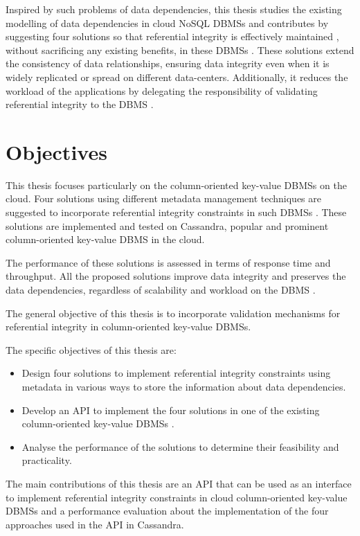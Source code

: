 Inspired by such problems of data dependencies,  this thesis studies the existing
modelling of data dependencies in cloud \ac{NoSQL}  \acp{DBMS}  and contributes by
suggesting four solutions so that referential integrity is effectively
maintained , without sacrificing any existing benefits,  in these \acp{DBMS} . 
These solutions extend the consistency of data relationships,   ensuring  data
integrity even when it is widely replicated or spread on different data-centers. 
Additionally,  it reduces the workload of the applications by delegating the
responsibility of validating referential integrity to the \ac{DBMS} . 



\section{Objectives} 

This thesis  focuses particularly on the column-oriented
key-value \acp{DBMS}  on the cloud.  Four  solutions 
using different metadata management techniques are suggested to incorporate
referential integrity constraints in such \acp{DBMS} .  These
solutions are implemented and tested on Cassandra, popular and
prominent column-oriented key-value \ac{DBMS}  in the cloud. 

The performance of these solutions is assessed  in terms of response time and
throughput.  All the proposed solutions  improve data integrity
and  preserves the data dependencies,  regardless of scalability and workload on
the \ac{DBMS} . 

The general objective of this thesis is to incorporate validation mechanisms for
referential integrity in column-oriented key-value \acp{DBMS}.  

The specific objectives of this thesis are:
\begin{itemize} 
  \item Design four solutions to implement referential integrity constraints
  using metadata in various ways to store the information about data
  dependencies. 
  \item Develop an \ac{API}  to implement the four solutions in one of the
  existing column-oriented key-value \acp{DBMS} .  
  \item Analyse the performance of the solutions to determine their
   feasibility and practicality. 
\end{itemize} 

The main contributions of this thesis are an \ac{API}  that can be
used as an interface to implement referential integrity constraints in cloud
column-oriented key-value \acp{DBMS}  and a performance evaluation about the
implementation of the four approaches used in the \ac{API}   in
Cassandra. 

